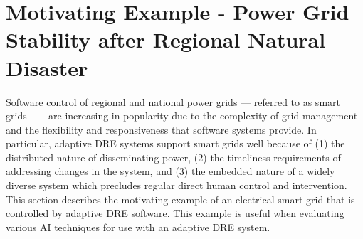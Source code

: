 \documentclass[conference]{IEEEtran}
\begin{document}
%


\section{Motivating Example - Power Grid Stability after Regional Natural Disaster}
\label{example}

Software control of regional and national power grids --- referred to as smart grids~\cite{Ramchurn:12} --- are increasing in popularity due to the complexity of grid management and the flexibility and responsiveness that software systems provide. In particular, adaptive DRE systems support smart grids well because of (1) the distributed nature of disseminating power, (2) the timeliness requirements of addressing changes in the system, and (3) the embedded nature of a widely diverse system which precludes regular direct human control and intervention. This section describes the motivating example of an electrical smart grid that is controlled by adaptive DRE software. This example is useful when evaluating various AI techniques for use with an adaptive DRE system.
\end{document}
